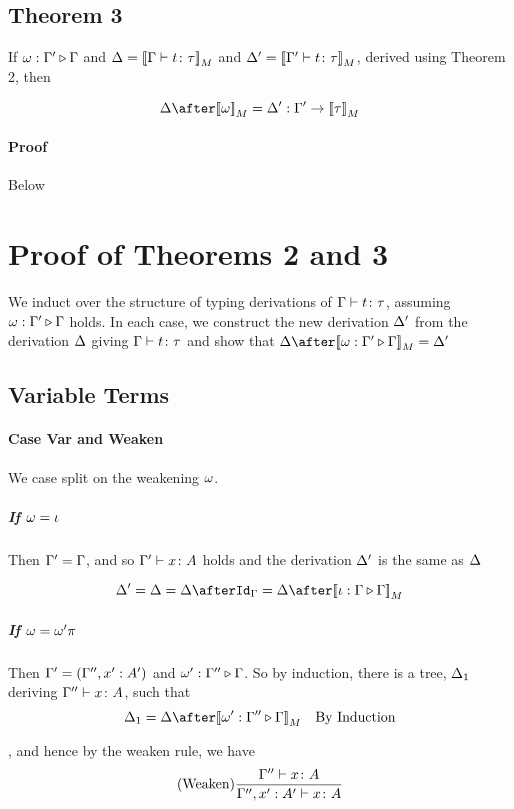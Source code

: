 {    \subsection{Theorem 3}

    If $\omega : \Gamma' \triangleright \Gamma$ and $\Delta = {\bf [\![}\Gamma \vdash t \colon \tau{\bf ]\!]}_M$ and $\Delta' = {\bf [\![}\Gamma' \vdash t \colon \tau{\bf ]\!]}_M$, derived using Theorem 2, then 

    $$
        \D \after \deno{\w} = \D' : \G' \rightarrow \deno{\tau}
    $$
    \paragraph{Proof} Below

    \section{Proof of Theorems 2 and 3}
    We induct over the structure of typing derivations of $\Gamma \vdash t \colon \tau$, assuming $\omega : \Gamma' \triangleright \Gamma$ holds. In each case, we construct the new derivation $\Delta'$ from the derivation $\Delta$ giving $\Gamma \vdash t \colon \tau$ and show that $\D\after\deno{\wrel{\w}{\G'}{\G}} = \D'$

    \subsection{Variable Terms}
    \paragraph{Case Var and Weaken}
        We case split on the weakening $\omega$.
        \subparagraph{If $\omega = \iota$}
        Then $\Gamma' = \Gamma$, and so $\Gamma' \vdash x \colon A$ holds and the derivation $\Delta'$ is the same as $\Delta$

        \begin{equation}
            \D' = \D = \D\after\idg = \D\after\deno{\wrel{\i}{\G}{\G}} 
        \end{equation}
        \subparagraph{If $\omega = \omega'\pi$}
        Then  $\Gamma' = (\Gamma'',x': A')$ and $\omega' : \Gamma'' \triangleright \Gamma$. So by induction, there is a tree, $\Delta_1$ deriving $\Gamma'' \vdash x \colon A$,  such that 
        \begin{equation}
            \D_1 = \D\after\deno{\wrel{\w'}{\G''}{\G}} \qt{By Induction}
        \end{equation}
        
        , and hence by the weaken rule, we have 
        \begin{equation}
            (\text{Weaken}) \frac{\Gamma'' \vdash x \colon A}{\Gamma'', x':A'  \vdash x \colon A}
        \end{equation}

}
